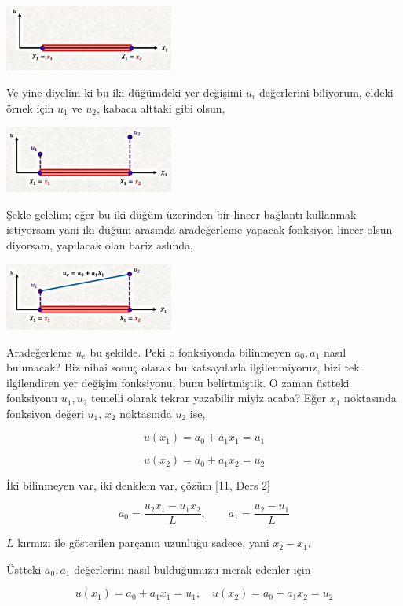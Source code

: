 \documentclass[12pt,fleqn]{article}\usepackage{../../common}
\begin{document}
\includegraphics[width=15em]{compscieng_bpp45fem2_05.jpg}

Ve yine diyelim ki bu iki düğümdeki yer değişimi $u_i$ değerlerini biliyorum,
eldeki örnek için $u_1$ ve $u_2$, kabaca alttaki gibi olsun,

\includegraphics[width=15em]{compscieng_bpp45fem2_06.jpg}

Şekle gelelim; eğer bu iki düğüm üzerinden bir lineer bağlantı kullanmak
istiyorsam yani iki düğüm arasında aradeğerleme yapacak fonksiyon lineer olsun
diyorsam, yapılacak olan bariz aslında,

\includegraphics[width=15em]{compscieng_bpp45fem2_07.jpg}

Aradeğerleme $u_e$ bu şekilde. Peki o fonksiyonda bilinmeyen $a_0,a_1$ nasıl
bulunacak? Biz nihai sonuç olarak bu katsayılarla ilgilenmiyoruz, bizi tek
ilgilendiren yer değişim fonksiyonu, bunu belirtmiştik. O zaman üstteki
fonksiyonu $u_1,u_2$ temelli olarak tekrar yazabilir miyiz acaba? Eğer $x_1$
noktasında fonksiyon değeri $u_1$, $x_2$ noktasında $u_2$ ise,

$$
u(x_1) = a_0 + a_1 x_1 = u_1
$$

$$
u(x_2) = a_0 + a_1 x_2 = u_2
$$

İki bilinmeyen var, iki denklem var, çözüm [11, Ders 2]

$$
a_0 = \frac{u_2 x_1 - u_1 x_2}{L}, \qquad a_1 = \frac{u_2 - u_1}{L}
$$

$L$ kırmızı ile gösterilen parçanın uzunluğu sadece, yani $x_2 - x_1$.

Üstteki $a_0,a_1$ değerlerini nasıl bulduğumuzu merak edenler için

$$
u(x_1) = a_0 + a_1 x_1 = u_1, \quad
u(x_2) = a_0 + a_1 x_2 = u_2
$$
\end{document}
